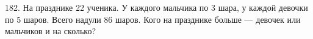 182. На празднике 22 ученика. У каждого мальчика по 3 шара, у каждой девочки по 5 шаров. Всего надули 86 шаров. Кого на празднике больше --- девочек или мальчиков и на сколько?\\

